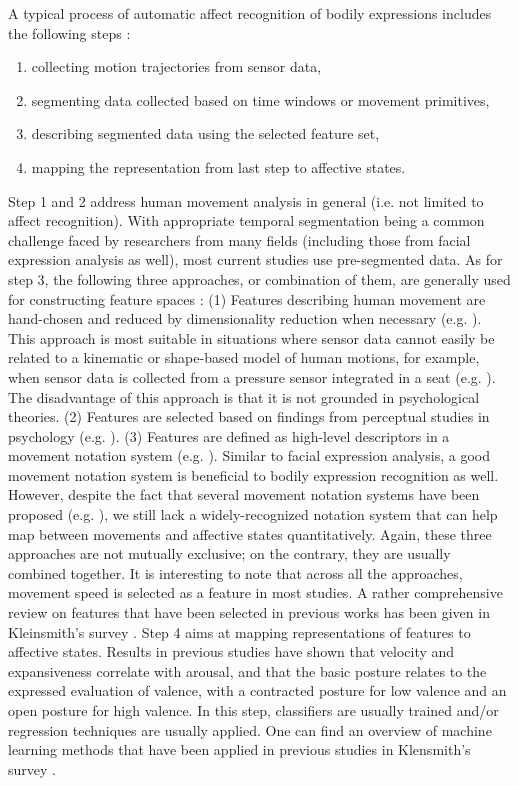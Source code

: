 A typical process of automatic affect recognition of bodily expressions includes the following steps \cite{karg2013body}:
\begin{enumerate}
\item collecting motion trajectories from sensor data,
\item segmenting data collected based on time windows or movement primitives,
\item describing segmented data using the selected feature set,
\item mapping the representation from last step to affective states.
\end{enumerate}
Step 1 and 2 address human movement analysis in general (i.e. not limited to affect recognition). With appropriate temporal segmentation being a common challenge faced by researchers from many fields (including those from facial expression analysis as well), most current studies use pre-segmented data. As for step 3, the following three approaches, or combination of them, are generally used for constructing feature spaces \cite{karg2013body}: (1) Features describing human movement are hand-chosen and reduced by dimensionality reduction when necessary (e.g. \cite{nicolaou2011continuous}). This approach is most suitable in situations where sensor data cannot easily be related to a kinematic or shape-based model of human motions, for example, when sensor data is collected from a pressure sensor integrated in a seat (e.g. \cite{d2009automatic}). The disadvantage of this approach is that it is not grounded in psychological theories. (2) Features are selected based on findings from perceptual studies in psychology (e.g. \cite{karg2010recognition}). (3) Features are defined as high-level descriptors in a movement notation system (e.g. \cite{castellano2007recognising}). Similar to facial expression analysis, a good movement notation system is beneficial to bodily expression recognition as well. However, despite the fact that several movement notation systems have been proposed (e.g. \cite{birdwhistell2011kinesics}), we still lack a widely-recognized notation system that can help map between movements and affective states quantitatively. Again, these three approaches are not mutually exclusive; on the contrary, they are usually combined together. It is interesting to note that across all the approaches, movement speed is selected as a feature in most studies. A rather comprehensive review on features that have been selected in previous works has been given in Kleinsmith's survey \cite{kleinsmith2013affective}. 
Step 4 aims at mapping representations of features to affective states. Results in previous studies \cite{beck2010interpretation} have shown that velocity and expansiveness correlate with arousal, and that the basic posture relates to the expressed evaluation of valence, with a contracted posture for low valence and an open posture for high valence. In this step, classifiers are usually trained and/or regression techniques are usually applied. One can find an overview of machine learning methods that have been applied in previous studies in Klensmith's survey \cite{kleinsmith2013affective}.

